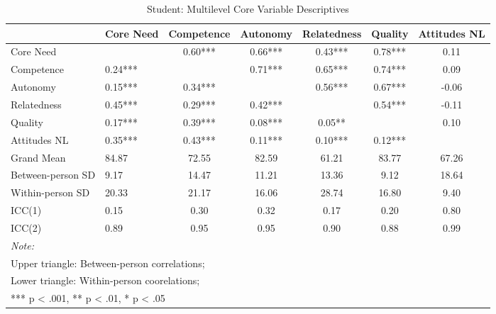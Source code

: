 \begin{table}
\begin{minipage}[t][\textheight][t]{\textwidth}

\caption{\label{tab:studentVarDescr}Student: Multilevel Core Variable Descriptives}
\centering
\begin{tabular}[t]{llccccc}
\toprule
  & Core Need & Competence & Autonomy & Relatedness & Quality & Attitudes NL\\
\midrule
Core Need &  & 0.60*** & 0.66*** & 0.43*** & 0.78*** & 0.11\\
Competence & 0.24*** &  & 0.71*** & 0.65*** & 0.74*** & 0.09\\
Autonomy & 0.15*** & 0.34*** &  & 0.56*** & 0.67*** & -0.06\\
Relatedness & 0.45*** & 0.29*** & 0.42*** &  & 0.54*** & -0.11\\
Quality & 0.17*** & 0.39*** & 0.08*** & 0.05** &  & 0.10\\
Attitudes NL & 0.35*** & 0.43*** & 0.11*** & 0.10*** & 0.12*** & \\
\addlinespace
Grand Mean & 84.87 & 72.55 & 82.59 & 61.21 & 83.77 & 67.26\\
Between-person SD & 9.17 & 14.47 & 11.21 & 13.36 & 9.12 & 18.64\\
Within-person SD & 20.33 & 21.17 & 16.06 & 28.74 & 16.80 & 9.40\\
ICC(1) & 0.15 & 0.30 & 0.32 & 0.17 & 0.20 & 0.80\\
ICC(2) & 0.89 & 0.95 & 0.95 & 0.90 & 0.88 & 0.99\\
\bottomrule
\multicolumn{7}{l}{\rule{0pt}{1em}\textit{Note: }}\\
\multicolumn{7}{l}{\rule{0pt}{1em}Upper triangle: Between-person correlations;}\\
\multicolumn{7}{l}{\rule{0pt}{1em}Lower triangle: Within-person coorelations;}\\
\multicolumn{7}{l}{\rule{0pt}{1em}*** p < .001, ** p < .01,  * p < .05}\\
\end{tabular}
\end{minipage}
\end{table}
